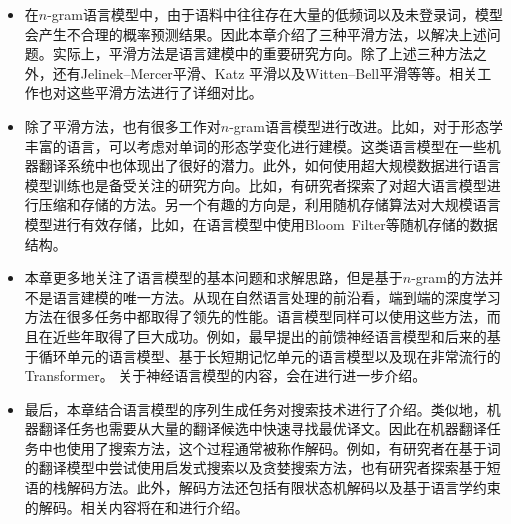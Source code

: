 \begin{adjustwidth}{1em}{}
\begin{itemize}
\vspace{0.5em}
\item 在$n$-gram语言模型中，由于语料中往往存在大量的低频词以及未登录词，模型会产生不合理的概率预测结果。因此本章介绍了三种平滑方法，以解决上述问题。实际上，平滑方法是语言建模中的重要研究方向。除了上述三种方法之外，还有Jelinek–Mercer平滑、Katz 平滑以及Witten–Bell平滑等等。相关工作也对这些平滑方法进行了详细对比。
\vspace{0.5em}
\item 除了平滑方法，也有很多工作对$n$-gram语言模型进行改进。比如，对于形态学丰富的语言，可以考虑对单词的形态学变化进行建模。这类语言模型在一些机器翻译系统中也体现出了很好的潜力。此外，如何使用超大规模数据进行语言模型训练也是备受关注的研究方向。比如，有研究者探索了对超大语言模型进行压缩和存储的方法。另一个有趣的方向是，利用随机存储算法对大规模语言模型进行有效存储，比如，在语言模型中使用Bloom\ Filter等随机存储的数据结构。
\vspace{0.5em}
\item 本章更多地关注了语言模型的基本问题和求解思路，但是基于$n$-gram的方法并不是语言建模的唯一方法。从现在自然语言处理的前沿看，端到端的深度学习方法在很多任务中都取得了领先的性能。语言模型同样可以使用这些方法，而且在近些年取得了巨大成功。例如，最早提出的前馈神经语言模型和后来的基于循环单元的语言模型、基于长短期记忆单元的语言模型以及现在非常流行的Transformer。 关于神经语言模型的内容，会在{\chapternine}进行进一步介绍。
\vspace{0.5em}
\item 最后，本章结合语言模型的序列生成任务对搜索技术进行了介绍。类似地，机器翻译任务也需要从大量的翻译候选中快速寻找最优译文。因此在机器翻译任务中也使用了搜索方法，这个过程通常被称作解码。例如，有研究者在基于词的翻译模型中尝试使用启发式搜索以及贪婪搜索方法，也有研究者探索基于短语的栈解码方法。此外，解码方法还包括有限状态机解码以及基于语言学约束的解码。相关内容将在{\chaptereight}和{\chapterfourteen}进行介绍。
\vspace{0.5em}
\end{itemize}
\end{adjustwidth}
